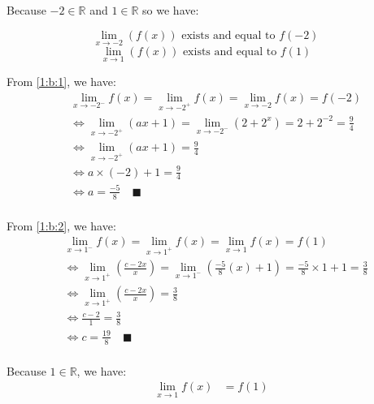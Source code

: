 \documentclass{article}
\begin{document}
\begin{enumerate}[label=({\alph*})]
        Because \(-2 \in \mathbb{R}\) and \(1 \in \mathbb{R}\) so we have:
 

        \begin{equation}
            \lim_{x \to -2}(f(x)) \text{ exists and equal to } f(-2) \quad \label{1:b:1}
        \end{equation}
        \begin{equation}
            \lim_{x \to 1}(f(x)) \text{ exists and equal to } f(1) \quad \label{1:b:2}
        \end{equation}

        From \eqref{1:b:1}, we have:
        \begin{align*}
            &\lim_{x\to-2^-} f(x) = \lim_{x\to-2^+} f(x) = \lim_{x\to-2} f(x) = f(-2)\\
            &\Leftrightarrow \lim_{x\to-2^+} (ax + 1) = \lim_{x\to-2^-} (2 + 2^x) = 2 + 2^{-2} = \frac{9}{4}\\
            &\Leftrightarrow \lim_{x\to-2^+} (ax + 1) = \frac{9}{4}\\
            &\Leftrightarrow a\times(-2) + 1 = \frac{9}{4}\\
            &\Leftrightarrow a = \frac{-5}{8} \quad \blacksquare\\    
        \end{align*}


        From \eqref{1:b:2}, we have:
        \begin{align*}
            &\lim_{x\to1^-} f(x) = \lim_{x\to1^+} f(x) = \lim_{x\to1} f(x) = f(1)\\
            &\Leftrightarrow \lim_{x\to 1^+} (\frac{c - 2x}{x}) = \lim_{x\to 1^-} (\frac{-5}{8}(x) + 1) = \frac{-5}{8}\times 1 + 1 = \frac{3}{8}\\
            &\Leftrightarrow \lim_{x\to 1^+} (\frac{c - 2x}{x}) = \frac{3}{8}\\
            &\Leftrightarrow \frac{c - 2}{1} = \frac{3}{8} \\
            &\Leftrightarrow c = \frac{19}{8} \quad \blacksquare\\
        \end{align*}

        Because \(1 \in \mathbb{R}\), we have:
        \begin{align*}
            \lim_{x \to 1}f(x) &= f(1) \\  
        \end{align*}


\end{enumerate}
\end{document}

